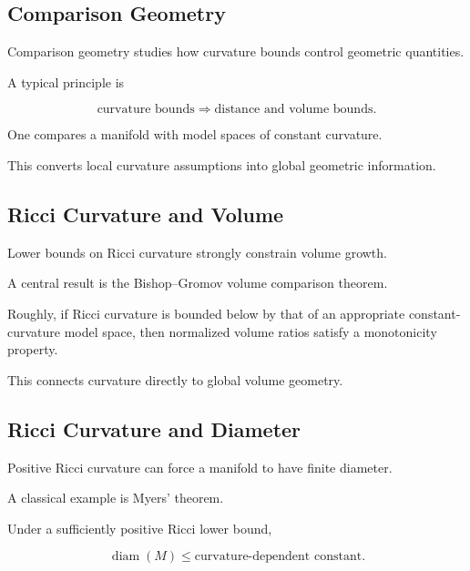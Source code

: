 \subsection{Comparison Geometry}
\label{subsec:comparison-geometry-analysis}

Comparison geometry studies how curvature bounds control geometric
quantities.

A typical principle is

\[
\boxed{
\text{curvature bounds}
\Longrightarrow
\text{distance and volume bounds}.
}
\]

One compares a manifold with model spaces of constant curvature.

This converts local curvature assumptions into global geometric
information.

\subsection{Ricci Curvature and Volume}
\label{subsec:ricci-volume-comparison}

Lower bounds on Ricci curvature strongly constrain volume growth.

A central result is the Bishop--Gromov volume comparison theorem.

Roughly, if Ricci curvature is bounded below by that of an appropriate
constant-curvature model space, then normalized volume ratios satisfy a
monotonicity property.

This connects curvature directly to global volume geometry.

\subsection{Ricci Curvature and Diameter}
\label{subsec:ricci-diameter}

Positive Ricci curvature can force a manifold to have finite diameter.

A classical example is Myers' theorem.

Under a sufficiently positive Ricci lower bound,

\[
\boxed{
\operatorname{diam}(M)
\leq
\text{curvature-dependent constant}.
}
\]


